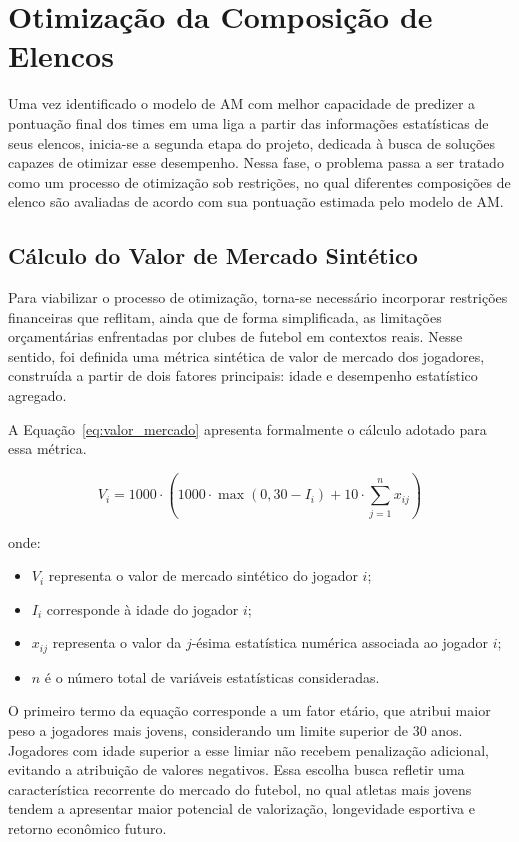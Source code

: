\chapter{Otimização da Composição de Elencos}

Uma vez identificado o modelo de AM com melhor capacidade de predizer a pontuação final dos times em uma liga a partir das informações estatísticas de seus elencos, 
inicia-se a segunda etapa do projeto, dedicada à busca de soluções capazes de otimizar esse desempenho. 
Nessa fase, o problema passa a ser tratado como um processo de otimização sob restrições, no qual diferentes composições de elenco são avaliadas de acordo com 
sua pontuação estimada pelo modelo de AM.

\section{Cálculo do Valor de Mercado Sintético}

Para viabilizar o processo de otimização, torna-se necessário incorporar restrições financeiras que reflitam, ainda que de forma simplificada, 
as limitações orçamentárias enfrentadas por clubes de futebol em contextos reais. 
Nesse sentido, foi definida uma métrica sintética de valor de mercado dos jogadores, construída a partir de dois fatores principais: 
idade e desempenho estatístico agregado.

A Equação~\ref{eq:valor_mercado} apresenta formalmente o cálculo adotado para essa métrica.

\begin{equation}
V_i = 1000 \cdot \left( 1000 \cdot \max(0, 30 - I_i) + 10 \cdot \sum_{j=1}^{n} x_{ij} \right)
\label{eq:valor_mercado}
\end{equation}

onde:
\begin{itemize}
    \item $V_i$ representa o valor de mercado sintético do jogador $i$;
    \item $I_i$ corresponde à idade do jogador $i$;
    \item $x_{ij}$ representa o valor da $j$-ésima estatística numérica associada ao jogador $i$;
    \item $n$ é o número total de variáveis estatísticas consideradas.
\end{itemize}

O primeiro termo da equação corresponde a um fator etário, que atribui maior peso a jogadores mais jovens, considerando um limite superior de 30 anos. 
Jogadores com idade superior a esse limiar não recebem penalização adicional, evitando a atribuição de valores negativos. 
Essa escolha busca refletir uma característica recorrente do mercado do futebol, no qual atletas mais jovens tendem a apresentar maior potencial de valorização, 
longevidade esportiva e retorno econômico futuro.

